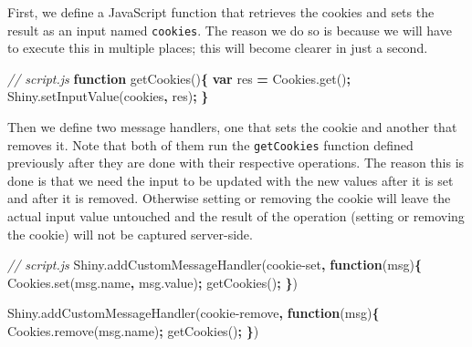 \documentclass[
  10pt,
]{krantz}
\makeatletter
\newenvironment{Shaded}{\begin{snugshade}}{\end{snugshade}}
\newcommand{\AttributeTok}[1]{\textcolor[rgb]{0.61,0.61,0.61}{#1}}
\newcommand{\CommentTok}[1]{\textcolor[rgb]{0.37,0.37,0.37}{\textit{#1}}}
\newcommand{\KeywordTok}[1]{\textcolor[rgb]{0.27,0.27,0.27}{\textbf{#1}}}
\newcommand{\NormalTok}[1]{#1}
\newcommand{\OperatorTok}[1]{\textcolor[rgb]{0.43,0.43,0.43}{\textbf{#1}}}
\newcommand{\StringTok}[1]{\textcolor[rgb]{0.5,0.5,0.5}{#1}}
\newcommand{\VariableTok}[1]{\textcolor[rgb]{0,0,0}{#1}}
\newenvironment{kframe}{%
\medskip{}
\setlength{\fboxsep}{.8em}
 \def\at@end@of@kframe{}%
 \ifinner\ifhmode%
  \def\at@end@of@kframe{\end{minipage}}%
  \begin{minipage}{\columnwidth}%
 \fi\fi%
 \def\FrameCommand##1{\hskip\@totalleftmargin \hskip-\fboxsep
 \colorbox{shadecolor}{##1}\hskip-\fboxsep
     \hskip-\linewidth \hskip-\@totalleftmargin \hskip\columnwidth}%
 \MakeFramed {\advance\hsize-\width
   \@totalleftmargin\z@ \linewidth\hsize
   \@setminipage}}%
 {\par\unskip\endMakeFramed%
 \at@end@of@kframe}
\renewenvironment{Shaded}{\begin{kframe}}{\end{kframe}}
\makeatother
\begin{document}
First, we define a JavaScript function that retrieves the cookies and sets the result as an input named \texttt{cookies}. The reason we do so is because we will have to execute this in multiple places; this will become clearer in just a second.

\begin{Shaded}
\begin{Highlighting}[]
\CommentTok{// script.js}
\KeywordTok{function} \AttributeTok{getCookies}\NormalTok{()}\OperatorTok{\{}
  \KeywordTok{var}\NormalTok{ res }\OperatorTok{=} \VariableTok{Cookies}\NormalTok{.}\AttributeTok{get}\NormalTok{()}\OperatorTok{;}
  \VariableTok{Shiny}\NormalTok{.}\AttributeTok{setInputValue}\NormalTok{(}\StringTok{\textquotesingle{}cookies\textquotesingle{}}\OperatorTok{,}\NormalTok{ res)}\OperatorTok{;}
\OperatorTok{\}}
\end{Highlighting}
\end{Shaded}

Then we define two message handlers, one that sets the cookie and another that removes it. Note that both of them run the \texttt{getCookies} function defined previously after they are done with their respective operations. The reason this is done is that we need the input to be updated with the new values after it is set and after it is removed. Otherwise setting or removing the cookie will leave the actual input value untouched and the result of the operation (setting or removing the cookie) will not be captured server-side.

\begin{Shaded}
\begin{Highlighting}[]
\CommentTok{// script.js}
\VariableTok{Shiny}\NormalTok{.}\AttributeTok{addCustomMessageHandler}\NormalTok{(}\StringTok{\textquotesingle{}cookie{-}set\textquotesingle{}}\OperatorTok{,} \KeywordTok{function}\NormalTok{(msg)}\OperatorTok{\{}
  \VariableTok{Cookies}\NormalTok{.}\AttributeTok{set}\NormalTok{(}\VariableTok{msg}\NormalTok{.}\AttributeTok{name}\OperatorTok{,} \VariableTok{msg}\NormalTok{.}\AttributeTok{value}\NormalTok{)}\OperatorTok{;}
  \AttributeTok{getCookies}\NormalTok{()}\OperatorTok{;}
\OperatorTok{\}}\NormalTok{)}

\VariableTok{Shiny}\NormalTok{.}\AttributeTok{addCustomMessageHandler}\NormalTok{(}\StringTok{\textquotesingle{}cookie{-}remove\textquotesingle{}}\OperatorTok{,} \KeywordTok{function}\NormalTok{(msg)}\OperatorTok{\{}
  \VariableTok{Cookies}\NormalTok{.}\AttributeTok{remove}\NormalTok{(}\VariableTok{msg}\NormalTok{.}\AttributeTok{name}\NormalTok{)}\OperatorTok{;}
  \AttributeTok{getCookies}\NormalTok{()}\OperatorTok{;}
\OperatorTok{\}}\NormalTok{)}
\end{Highlighting}
\end{Shaded}
\end{document}
